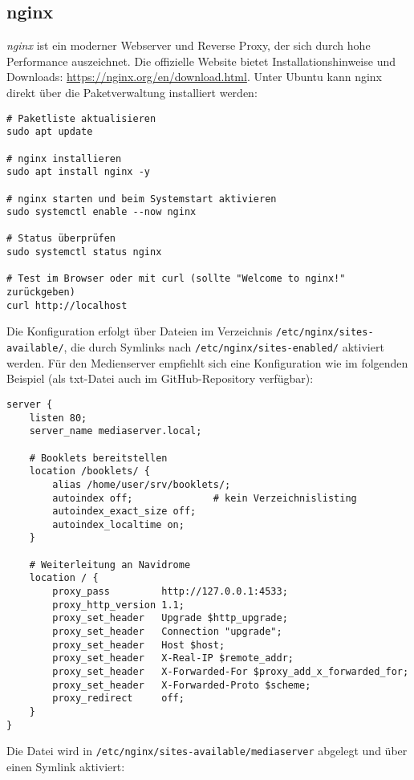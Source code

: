 \documentclass[12pt,a4paper]{report}
\begin{document}
  \subsection{nginx}  
  \emph{nginx} ist ein moderner Webserver und Reverse Proxy, der sich durch hohe Performance auszeichnet.  
  Die offizielle Website bietet Installationshinweise und Downloads: \url{https://nginx.org/en/download.html}.  
  Unter Ubuntu kann nginx direkt über die Paketverwaltung installiert werden:

  \begin{verbatim}
# Paketliste aktualisieren
sudo apt update

# nginx installieren
sudo apt install nginx -y

# nginx starten und beim Systemstart aktivieren
sudo systemctl enable --now nginx

# Status überprüfen
sudo systemctl status nginx

# Test im Browser oder mit curl (sollte "Welcome to nginx!" zurückgeben)
curl http://localhost
  \end{verbatim} 

  Die Konfiguration erfolgt über Dateien im Verzeichnis \texttt{/etc/nginx/sites-available/}, 
  die durch Symlinks nach \texttt{/etc/nginx/sites-enabled/} aktiviert werden.  
  Für den Medienserver empfiehlt sich eine Konfiguration wie im folgenden Beispiel (als txt-Datei auch im GitHub-Repository verfügbar):  

  \begin{verbatim}
server {
    listen 80;
    server_name mediaserver.local;

    # Booklets bereitstellen
    location /booklets/ {
        alias /home/user/srv/booklets/;
        autoindex off;              # kein Verzeichnislisting
        autoindex_exact_size off;
        autoindex_localtime on;
    }

    # Weiterleitung an Navidrome
    location / {
        proxy_pass         http://127.0.0.1:4533;
        proxy_http_version 1.1;
        proxy_set_header   Upgrade $http_upgrade;
        proxy_set_header   Connection "upgrade";
        proxy_set_header   Host $host;
        proxy_set_header   X-Real-IP $remote_addr;
        proxy_set_header   X-Forwarded-For $proxy_add_x_forwarded_for;
        proxy_set_header   X-Forwarded-Proto $scheme;
        proxy_redirect     off;
    }
}
  \end{verbatim}  

  Die Datei wird in \texttt{/etc/nginx/sites-available/mediaserver} abgelegt 
  und über einen Symlink aktiviert:  
\end{document}
